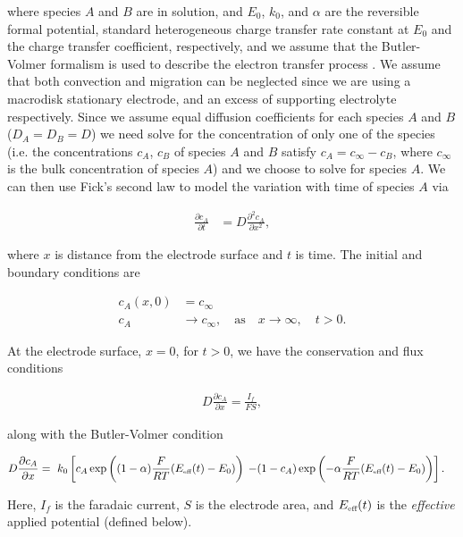 \documentclass[a4paper, 12pt]{article}
\begin{document}
where species $A$ and $B$ are in solution, and $E_0$, $k_0$, and $\alpha$  are 
the reversible formal potential, standard heterogeneous charge transfer rate 
constant at $E_0$ and the charge transfer coefficient, respectively, and we 
assume that the Butler-Volmer formalism is used to describe the electron 
transfer process 
\cite{BardFaulkner,brett1993principles,pletcher2001instrumental}. We assume that 
both convection and migration can be neglected since we are using a macrodisk 
stationary electrode, and an excess of supporting electrolyte respectively.  
Since we assume equal diffusion coefficients for each species $A$ and $B$ ($D_A 
= D_B = D$) we need solve for the concentration of only one of the species  
(i.e. the concentrations $c_A$, $c_B$ of species $A$ and $B$ satisfy $c_A   = 
c_{\infty} - c_B $, where $c_\infty$ is the bulk concentration of species $A$) 
and we choose to solve for species $A$. We can then use Fick's second law to 
model the variation with time of species $A$ via

\begin{align}
\frac{\partial c_A}{\partial t} &= D \frac{\partial^2 c_A}{\partial x^2}, \label{diffeqtn}
\end{align}

where $x$ is distance from the electrode surface and $t$ is time. The initial 
and boundary conditions are 

\begin{align}
c_A(x,0) &= c_{\infty} \nonumber \\
c_A &\rightarrow c_{\infty},  \quad \text{as} \quad x \rightarrow \infty,\quad t>0. \label{icsandbcs}
\end{align}

At the electrode surface, $x=0$, for $t>0$, we have the conservation and flux conditions

\begin{align}
D \frac{\partial c_A}{\partial x}=\frac{I_f}{FS}, \label{fluxatelectrode}
\end{align}

along with the Butler-Volmer condition

\begin{align}
D \frac{\partial c_A}{\partial x} = \text{ }&k_0 \left[c_A\exp\left((1-\alpha )\frac{F}{RT}(E_{\mbox{\tiny eff}}(t)-E_0)\right)\right.
\left.-(1-c_A)\exp\left(-\alpha\frac{F}{RT}(E_{\mbox{\tiny eff}}(t)-E_0)\right)\right]. \label{BVeqtn}
\end{align}

Here, $I_f$ is the faradaic current, $S$ is the electrode area, and 
$E_{\mbox{\tiny eff}}(t)$ is the {\em effective} applied potential (defined 
below).
\end{document}
